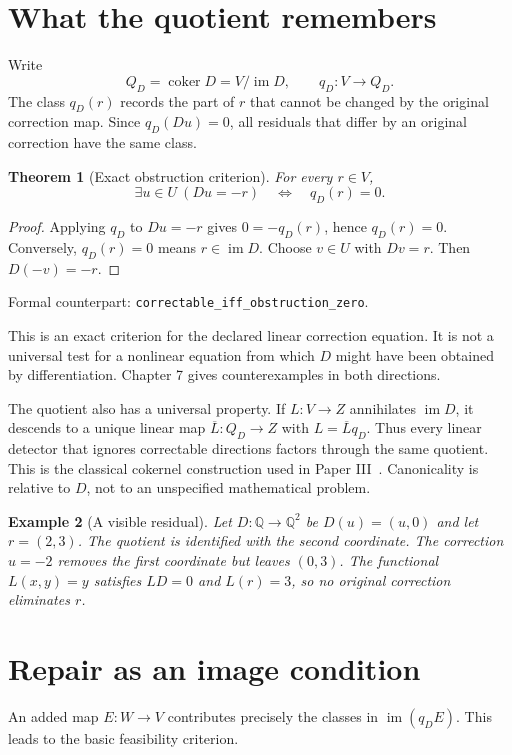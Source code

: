 \documentclass[11pt,letterpaper,oneside,openany]{book}
\theoremstyle{quiet}
\newtheorem{theorem}{Theorem}[chapter]
\newtheorem{example}[theorem]{Example}
\newcommand{\Q}{\mathbb{Q}}
\DeclareMathOperator{\im}{im}
\DeclareMathOperator{\coker}{coker}
\newcommand{\formal}[1]{\par\nobreak\begingroup\footnotesize\color{Slate}\sffamily Formal counterpart: \normalfont\nolinkurl{#1}.\par\endgroup}
\begin{document}
\section{What the quotient remembers}
Write
\[
Q_D=\coker D=V/\im D,\qquad q_D:V\longrightarrow Q_D.
\]
The class $q_D(r)$ records the part of $r$ that cannot be changed by the original correction map. Since $q_D(Du)=0$, all residuals that differ by an original correction have the same class.

\begin{theorem}[Exact obstruction criterion]\label{thm:correctable}
For every $r\in V$,
\[
\exists u\in U\ (Du=-r)\quad\Longleftrightarrow\quad q_D(r)=0.
\]
\end{theorem}
\begin{proof}
Applying $q_D$ to $Du=-r$ gives $0=-q_D(r)$, hence $q_D(r)=0$. Conversely, $q_D(r)=0$ means $r\in\im D$. Choose $v\in U$ with $Dv=r$. Then $D(-v)=-r$.
\end{proof}
\formal{correctable_iff_obstruction_zero}

This is an exact criterion for the declared linear correction equation. It is not a universal test for a nonlinear equation from which $D$ might have been obtained by differentiation. Chapter 7 gives counterexamples in both directions.

The quotient also has a universal property. If $L:V\to Z$ annihilates $\im D$, it descends to a unique linear map $\overline L:Q_D\to Z$ with $L=\overline Lq_D$. Thus every linear detector that ignores correctable directions factors through the same quotient. This is the classical cokernel construction used in Paper III~\cite{paperiii}. Canonicality is relative to $D$, not to an unspecified mathematical problem.

\begin{example}[A visible residual]\label{ex:plane}
Let $D:\Q\to\Q^2$ be $D(u)=(u,0)$ and let $r=(2,3)$. The quotient is identified with the second coordinate. The correction $u=-2$ removes the first coordinate but leaves $(0,3)$. The functional $L(x,y)=y$ satisfies $LD=0$ and $L(r)=3$, so no original correction eliminates $r$.
\end{example}

\section{Repair as an image condition}
An added map $E:W\to V$ contributes precisely the classes in $\im(q_DE)$. This leads to the basic feasibility criterion.
\end{document}
